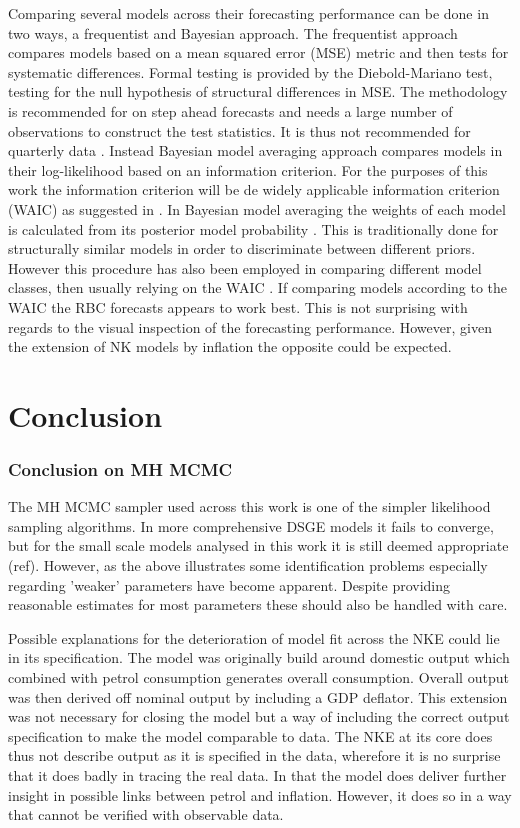 \documentclass[12pt,a4paper,english]{article} %
\let\oldsection\section
\renewcommand\section{\clearpage\oldsection}
\begin{document}
	Comparing several models across their forecasting performance can be done in two ways, a frequentist and Bayesian approach.
	The frequentist approach compares models based on a mean squared error (MSE) metric and then tests for systematic differences. Formal testing is provided by the Diebold-Mariano test, testing for the null hypothesis of structural differences in MSE. The methodology is recommended for on step ahead forecasts and needs a large number of observations to construct the test statistics. It is thus not recommended for quarterly data \cite{chin_bayesian_2019}.
	Instead Bayesian model averaging approach compares models in their log-likelihood based on an information criterion. For the purposes of this work the information criterion will be de widely applicable information criterion (WAIC) as suggested in \cite{chin_bayesian_2019}. In Bayesian model averaging the weights of each model is calculated from its posterior model probability \cite{chin_bayesian_2019}. This is traditionally done for structurally similar models in order to discriminate between different priors. However this procedure has also been employed in comparing different model classes, then usually relying on the WAIC \cite{chin_bayesian_2019}.
	If comparing models according to the WAIC the RBC forecasts appears to work best. This is not surprising with regards to the visual inspection of the forecasting performance. However, given the extension of NK models by inflation the opposite could be expected.
	
	\section{Conclusion}
	\subsubsection{Conclusion on MH MCMC}
	The MH MCMC sampler used across this work is one of the simpler likelihood sampling algorithms. In more comprehensive DSGE models it fails to converge, but for the small scale models analysed in this work it is still deemed appropriate (ref). However, as the above illustrates some identification problems especially regarding 'weaker' parameters have become apparent. Despite providing reasonable estimates for most parameters these should also be handled with care. 
	
	Possible explanations for the deterioration of model fit across the NKE could lie in its specification. The model was originally build around domestic output which combined with petrol consumption generates overall consumption. Overall output was then derived off nominal output by including a GDP deflator. This extension was not necessary for closing the model but a way of including the correct output specification to make the model comparable to data. The NKE at its core does thus not describe output as it is specified in the data, wherefore it is no surprise that it does badly in tracing the real data. In that the model does deliver further insight in possible links between petrol and inflation. However, it does so in a way that cannot be verified with observable data.
	
\end{document}
